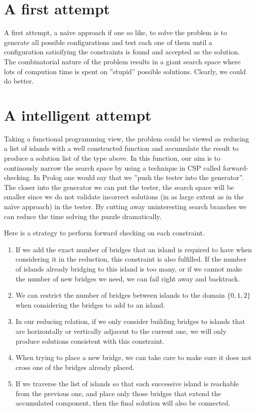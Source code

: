 \documentclass[a4paper,12pt]{article}
\begin{document}
\section*{A first attempt}
A first attempt, a naïve approach if one so like, to solve the problem is to generate all possible configurations and test each one of them until a configuration satisifying the constraints is found and accepted as the solution. The combinatorial nature of the problem results in a giant search space where lots of compution time is spent on ''stupid'' possible solutions. Clearly, we could do better.

\section*{A intelligent attempt}
Taking a functional programming view, the problem could be viewed as reducing a list of islands with a well constructed function and accumulate the result to produce a solution list of the type above. In this function, our aim is to continously narrow the search space by using a technique in CSP called forward-checking. In Prolog one would say that we ''push the tester into the generator''. The closer into the generator we can put the tester, the search space will be smaller since we do not validate incorrect solutions (in as large extent as in the naïve approach) in the tester. By cutting away uninteresting search branches we can reduce the time solving the puzzle dramatically.

Here is a strategy to perform forward checking on each constraint.
\begin{enumerate}
    \item If we add the exact number of bridges that an island is required to have when considering it in the reduction, this constraint is also fulfilled. If the number of islands already bridging to this island is too many, or if we cannot make the number of new bridges we need, we can fail right away and backtrack.
    \item We can restrict the number of bridges between islands to the domain $\{ 0, 1, 2 \}$ when considering the bridges to add to an island.
    \item In our reducing relation, if we only consider building bridges to islands that are horizontally or vertically adjacent to the current one, we will only produce solutions consistent with this constraint.
    \item When trying to place a new bridge, we can take care to make sure it does not cross one of the bridges already placed.
    \item If we traverse the list of islands so that each successive island is reachable from the previous one, and place only those bridges that extend the accumulated component, then the final solution will also be connected.
\end{enumerate}
\end{document}
